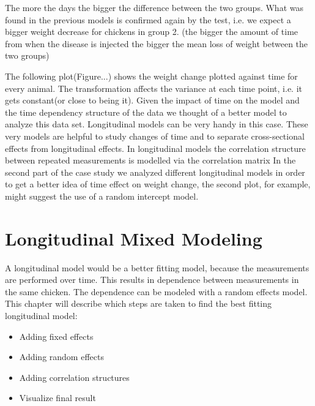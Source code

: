 \documentclass{article}
\begin{document}
The more the days the bigger the difference between the two groups. What was found in the previous models is confirmed again by the test, i.e. we expect a bigger weight decrease for chickens in group 2. (the bigger the amount of time from when the disease is injected the bigger the mean loss of weight between the two groups)


The following plot(Figure...) shows the weight change plotted against time for every animal. The transformation affects the variance at each time point, i.e. it gets constant(or close to being it). 
Given the impact of time on the model and the time dependency structure of the data we thought of a better model to analyze this data set. Longitudinal models can be very handy in this case. These very models are helpful to study changes of time and to separate cross-sectional effects from longitudinal effects. In longitudinal models the correlation structure between repeated measurements is modelled via the correlation matrix
In the second part of the case study we analyzed different longitudinal models in order to get a better idea of time effect on weight change, the second plot, for example, might suggest the use of a random intercept model.








\section{Longitudinal Mixed Modeling}

A longitudinal model would be a better fitting model, because the measurements are performed over time. This results in dependence between measurements in the same chicken. The dependence can be modeled with a random effects model. This chapter will describe which steps are taken to find the best fitting longitudinal model:
\begin{itemize}
    \item Adding fixed effects
    \item Adding random effects
    \item Adding correlation structures
    \item Visualize final result
\end{itemize}
\end{document}
